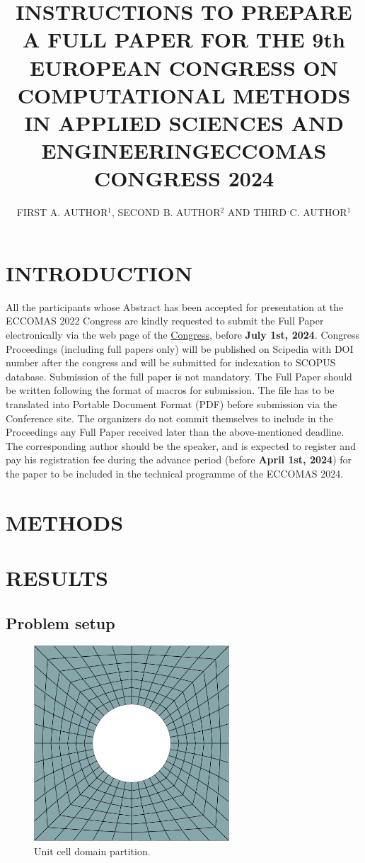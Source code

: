 \documentclass[a4paper]{eccomas_paper-2024}
\title{INSTRUCTIONS TO PREPARE A FULL PAPER FOR THE 9th EUROPEAN CONGRESS ON COMPUTATIONAL METHODS IN APPLIED SCIENCES AND ENGINEERING\break ECCOMAS CONGRESS 2024}
\author{FIRST A. AUTHOR$^1$, SECOND B. AUTHOR$^2$ AND THIRD C. AUTHOR$^1$}
\begin{document}
\thispagestyle{empty}

\section{INTRODUCTION}

All the participants whose Abstract has been accepted for presentation at the ECCOMAS 2022 Congress are kindly requested to submit the Full Paper electronically via the web page of the \href{https://eccomas2024.org/lisbon}{Congress}, before \textbf{July 1st, 2024}. Congress Proceedings (including full papers only) will be published on Scipedia with DOI number after the congress and will be submitted for indexation to SCOPUS database. Submission of the full paper is not mandatory. The Full Paper should be written following the format of macros for submission. The file has to be translated into Portable Document Format (PDF) before submission via the Conference site. The organizers do not commit themselves to include in the Proceedings any Full Paper received later than the above-mentioned deadline. The corresponding author should be the speaker, and is expected to register and pay his registration fee during the advance period (before \textbf{April 1st, 2024}) for the paper to be included in the technical programme of the ECCOMAS 2024.

\section{METHODS}

\section{RESULTS}

\subsection{Problem setup}

\begin{figure}
    \begin{center}
        \includegraphics[width=0.65\textwidth]{../figures/beam/unit_cell.png}
    \end{center}
    \caption{Unit cell domain partition.}\label{fig:unit_cell_mesh}
\end{figure}
\end{document}
